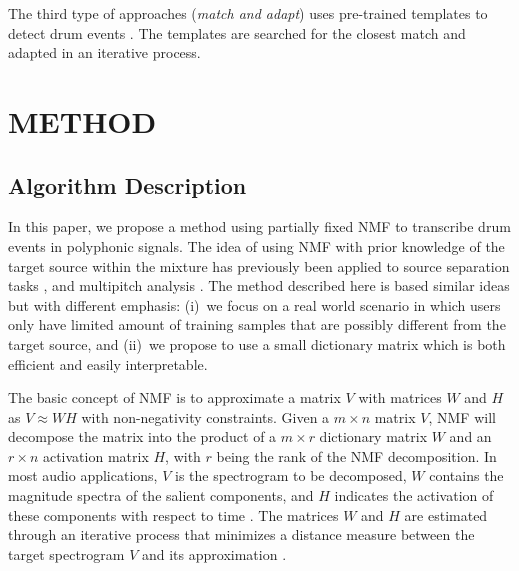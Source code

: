 \documentclass{article}
\begin{document}
The third type of approaches (\textit{match and adapt}) uses pre-trained templates to detect drum events \cite{yoshii_Drum_2007}. The templates are searched for the closest match and adapted in an iterative process. %
 

\vspace{-2mm}
\section{METHOD}\label{sec:method}
\subsection{Algorithm Description}\label{subsec:algorithm description}
In this paper, we propose a method using partially fixed NMF to transcribe drum events in polyphonic signals. The idea of using NMF with prior knowledge of the target source within the mixture has previously been applied to source separation tasks \cite{smaragdis_ssnmf_2007}, and multipitch analysis \cite{raczynski_Hnmf_2007}. The method described here is based similar ideas but with different emphasis: 
(i)~we focus on a real world scenario in which users only have limited amount of training samples that are possibly different from the target source, and
(ii)~we propose to use a small dictionary matrix which is both efficient and easily interpretable.   

The basic concept of NMF is to approximate a matrix $V$ with matrices $W$ and $H$ as $V \approx WH$ with non-negativity constraints. Given a $m \times n$ matrix $V$, NMF will decompose the matrix into the product of a $m \times r$ dictionary matrix $W$ and an $r \times n$ activation matrix $H$, with $r$ being the rank of the NMF decomposition. In most audio applications, $V$ is the spectrogram to be decomposed, $W$ contains the magnitude spectra of the salient components, and $H$ indicates the activation of these components with respect to time \cite{smaragdis_non-negative_2003}. The matrices $W$ and $H$ are estimated through an iterative process that minimizes a distance measure between the target spectrogram $V$ and its approximation \cite{lee_algorithms_2000}. 
\end{document}

